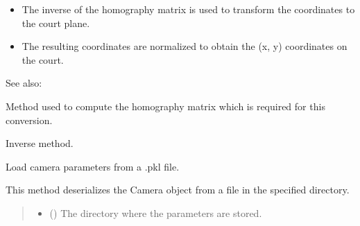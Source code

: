 \documentclass[letterpaper,10pt,english]{sphinxmanual}
\begin{document}
\begin{fulllineitems}
\begin{fulllineitems}
\begin{itemize}
\item {} 
\sphinxAtStartPar
The inverse of the homography matrix is used to transform the coordinates to the court plane.

\item {} 
\sphinxAtStartPar
The resulting coordinates are normalized to obtain the (x, y) coordinates on the court.

\end{itemize}


\begin{sphinxseealso}{See also:}
\begin{description}
\sphinxAtStartPar
Method used to compute the homography matrix which is required for this conversion.

\sphinxAtStartPar
Inverse method.

\end{description}


\end{sphinxseealso}


\end{fulllineitems}


\begin{fulllineitems}
\label{\detokenize{CameraUtils:CameraUtils.Camera.LoadCamera}}
\pysigstartsignatures
{}
\pysigstopsignatures
\sphinxAtStartPar
Load camera parameters from a .pkl file.

\sphinxAtStartPar
This method deserializes the Camera object from a file in the specified
directory.
\begin{quote}\begin{description}
\begin{itemize}
\item {} 
\sphinxAtStartPar
{} () \textendash{} The directory where the parameters are stored.


\end{itemize}
\end{description}
\end{quote}
\end{fulllineitems}
\end{fulllineitems}
\end{document}
